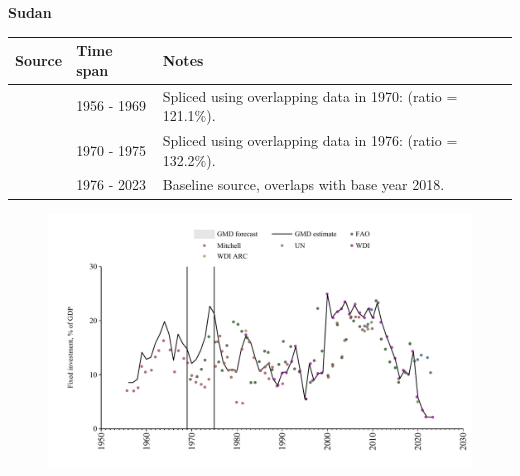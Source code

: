 \documentclass[12pt,a4paper,landscape]{article}
\begin{document}
\begin{adjustbox}{max totalsize={\paperwidth}{\paperheight},center}
\begin{minipage}[t][\textheight][t]{\textwidth}
\vspace*{0.5cm}
{}
\begin{center}
{\Large\bfseries Sudan}
\end{center}
\vspace{0.5cm}
\begin{table}[H]
\centering
\small
\begin{tabular}{|l|l|l|}
\hline
\textbf{Source} & \textbf{Time span} & \textbf{Notes} \\
\hline
\rowcolor{white}\cite{Mitchell}& 1956 - 1969 &Spliced using overlapping data in 1970: (ratio = 121.1\%).\\
\rowcolor{lightgray}\cite{UN}& 1970 - 1975 &Spliced using overlapping data in 1976: (ratio = 132.2\%).\\
\rowcolor{white}\cite{WDI}& 1976 - 2023 &Baseline source, overlaps with base year 2018.\\
\hline
\end{tabular}
\end{table}
\begin{figure}[H]
\centering
\includegraphics[width=\textwidth,height=0.6\textheight,keepaspectratio]{graphs/SDN_finv_GDP.pdf}
\end{figure}
\end{minipage}
\end{adjustbox}
\end{document}
